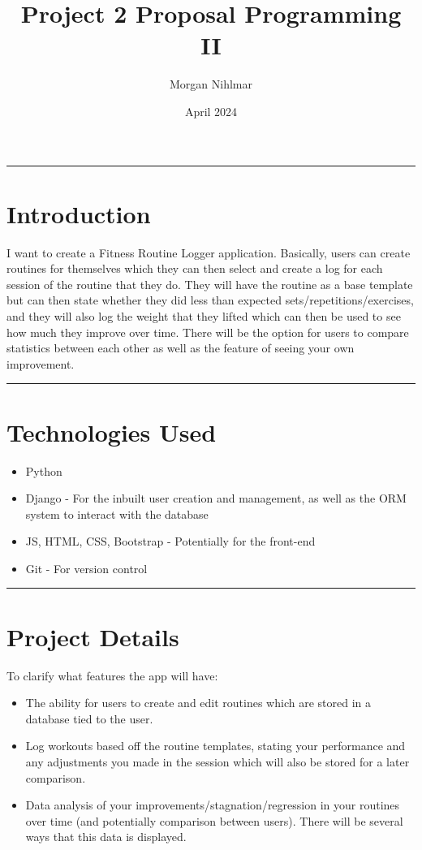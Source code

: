 \documentclass{article}
\title{Project 2 Proposal Programming II}
\author{Morgan Nihlmar}
\date{April 2024}
\begin{document}
\maketitle
\hrule
\section{Introduction}
I want to create a Fitness Routine Logger application. Basically, users can create routines for themselves which they can then select and create a log for each session of the routine that they do. They will have the routine as a base template but can then state whether they did less than expected sets/repetitions/exercises, and they will also log the weight that they lifted which can then be used to see how much they improve over time. There will be the option for users to compare statistics between each other as well as the feature of seeing your own improvement. 
\vspace{0.1cm}
\hrule

\section{Technologies Used}
\begin{itemize}
    \item Python
    \item Django - For the inbuilt user creation and management, as well as the ORM system to interact with the database
    \item JS, HTML, CSS, Bootstrap - Potentially for the front-end
    \item Git - For version control
\end{itemize}
\hrule


\section{Project Details}
To clarify what features the app will have: 
\begin{itemize}
    \item The ability for users to create and edit routines which are stored in a database tied to the user.
    \item Log workouts based off the routine templates, stating your performance and any adjustments you made in the session which will also be stored for a later comparison.
    \item Data analysis of your improvements/stagnation/regression in your routines over time (and potentially comparison between users). There will be several ways that this data is displayed.
\end{itemize}
\end{document}

